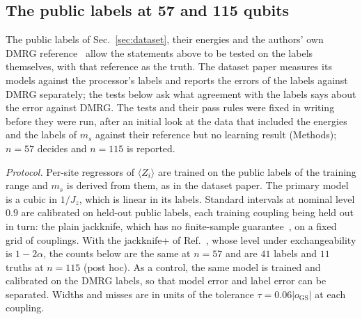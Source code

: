 \documentclass[aps,prx,twocolumn,10pt,superscriptaddress,nofootinbib,longbibliography,floatfix]{revtex4-2}
\theoremstyle{remark}
\newcommand{\Jz}{J_z}
\newcommand{\ms}{m_s}
\newcommand{\GS}{\mathrm{GS}}
\begin{document}
\subsection{The public labels at 57 and 115 qubits}
\label{sec:realistic}

The public labels of Sec.~\ref{sec:dataset}, their energies and the authors' own DMRG
reference~\cite{jaderberg2026data} allow the statements above to be
tested on the labels themselves, with that reference as the truth. The dataset paper measures its models against
the processor's labels and reports the errors of the labels against DMRG separately; the tests below ask what
agreement with the labels says about the error against DMRG. The tests and their pass rules were fixed in
writing before they were run, after an initial look at the data that included the energies and the labels of $\ms$
against their reference but no learning result (Methods); $n=57$ decides and $n=115$ is reported. %

\emph{Protocol.} Per-site regressors of $\langle Z_i\rangle$ are trained on the public labels of the training range
and $\ms$ is derived from them, as in the dataset paper. The primary model is a cubic in $1/\Jz$, which is linear in
its labels. Standard intervals at nominal level $0.9$ are calibrated on held-out public labels, each %
training coupling being held out in turn: the plain jackknife, which has no finite-sample guarantee~\cite{barber2019},
on a fixed grid of couplings. With the jackknife+ of Ref.~\cite{barber2019}, whose level under exchangeability is
$1-2\alpha$, the counts below are the same at $n=57$ and are $41$ labels and $11$ truths at $n=115$ (post hoc). %
As a control, the same model is trained and calibrated on the DMRG
labels, so that model error and label error can be separated. Widths and misses are in units of the tolerance
$\tau=0.06|o_\GS|$ at each coupling. %
\end{document}
